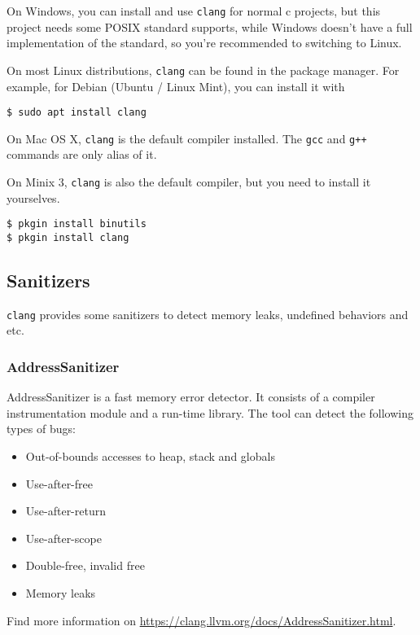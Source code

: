 \documentclass[11pt,a4paper]{article}
\begin{document}
On Windows, you can install and use \texttt{clang} for normal c projects, but this project needs some POSIX standard supports, while Windows doesn't have a full implementation of the standard, so you're recommended to switching to Linux. \smallskip

\noindent On most Linux distributions, \texttt{clang} can be found in the package manager. For example, for Debian (Ubuntu / Linux Mint), you can install it with

\begin{verbatim}
$ sudo apt install clang
\end{verbatim}

\noindent On Mac OS X, \texttt{clang} is the default compiler installed. The \texttt{gcc} and \texttt{g++} commands are only alias of it. \smallskip

\noindent On Minix 3, \texttt{clang} is also the default compiler, but you need to install it yourselves.

\begin{verbatim}
$ pkgin install binutils
$ pkgin install clang
\end{verbatim}

\subsection{Sanitizers}

\texttt{clang} provides some sanitizers to detect memory leaks, undefined behaviors and etc.

\subsubsection{AddressSanitizer}

AddressSanitizer is a fast memory error detector. It consists of a compiler instrumentation module and a run-time library. The tool can detect the following types of bugs:

\begin{itemize}
	\item Out-of-bounds accesses to heap, stack and globals
	\item Use-after-free
	\item Use-after-return
	\item Use-after-scope
	\item Double-free, invalid free
	\item Memory leaks
\end{itemize}

\noindent Find more information on \url{https://clang.llvm.org/docs/AddressSanitizer.html}.
\end{document}
